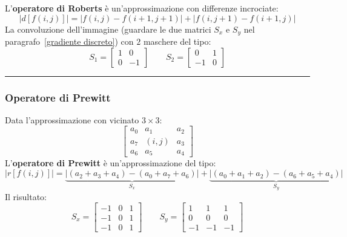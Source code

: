 \documentclass[a4paper]{article}
\newcommand{\longline}{\noindent\rule{\textwidth}{0.4pt}}
\begin{document}
	L'\textcolor{Red3}{\textbf{operatore di Roberts}} è un'approssimazione con differenze incrociate:
	\begin{equation*}
		\left|d\left[f\left(i,j\right)\right]\right| = \left|f\left(i,j\right) - f\left(i+1, j+1\right)\right| + \left|f\left(i, j+1\right) - f\left(i+1, j\right)\right|
	\end{equation*}
	La convoluzione dell'immagine (guardare le due matrici $S_{x}$ e $S_{y}$ nel paragrafo~\ref{gradiente discreto}) con $2$ maschere del tipo:
	\begin{equation*}
		S_{1} = \begin{bmatrix}
			1 & 0 \\
			0 & -1
		\end{bmatrix} \hspace{2em} S_{2} = \begin{bmatrix}
			0 & 1 \\
			-1 & 0
	\end{bmatrix}
	\end{equation*}

	\longline
	
	\subsubsection{Operatore di Prewitt}
	
	Data l'approssimazione con vicinato $3\times3$:
	\begin{equation*}
		\begin{bmatrix}
			a_{0} & a_{1} & a_{2} \\
			a_{7} & \left(i,j\right) & a_{3} \\
			a_{6} & a_{5} & a_{4}
		\end{bmatrix}
	\end{equation*}
	L'\textcolor{Red3}{\textbf{operatore di Prewitt}} è un'approssimazione del tipo:
	\begin{equation*}
		\left|r\left[f\left(i,j\right)\right]\right| = \underbrace{\left|\left(a_{2}+a_{3}+a_{4}\right) - \left(a_{0}+a_{7}+a_{6}\right)\right|}_{S_{x}} + \underbrace{\left|\left(a_{0}+a_{1}+a_{2}\right) - \left(a_{6}+a_{5}+a_{4}\right)\right|}_{S_{y}}
	\end{equation*}
	Il risultato:
	\begin{equation*}
		S_{x} = \begin{bmatrix}
			-1 & 0 & 1 \\
			-1 & 0 & 1 \\
			-1 & 0 & 1
		\end{bmatrix} \hspace{2em}
		S_{y} = \begin{bmatrix}
			1  & 1  & 1 \\
			0  & 0  & 0 \\
			-1 & -1 & -1
		\end{bmatrix}
	\end{equation*}\newpage
	
\end{document}
